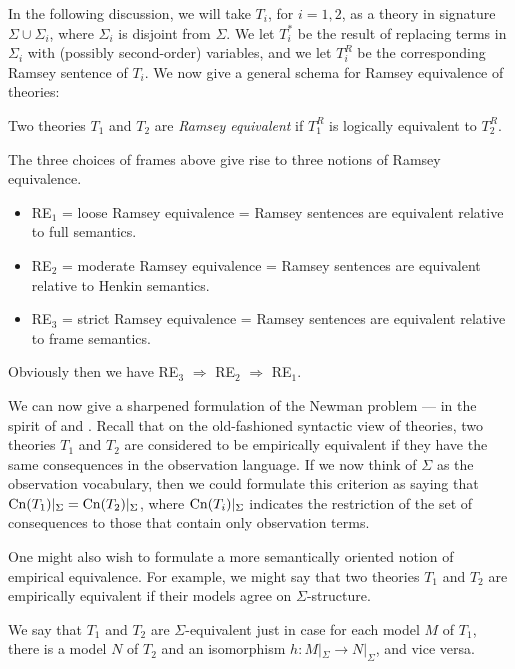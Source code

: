   In the following discussion, we will take $T_i$, for $i=1,2$, as a
  theory in signature $\Sigma\cup \Sigma _i$, where $\Sigma _i$ is
  disjoint from $\Sigma$.  We let $T_i^*$ be the result of replacing
  terms in $\Sigma _i$ with (possibly second-order) variables, and we
  let $T_i^R$ be the corresponding Ramsey sentence of $T_i$.  We now
  give a general schema for Ramsey equivalence of theories:
  \begin{defn} Two theories $T_1$ and $T_2$ are \emph{Ramsey
      equivalent} if $T_1^R$ is logically equivalent to
    $T_2^R$. \end{defn} \noindent The three choices of frames above
  give rise to three notions of Ramsey equivalence.
\begin{itemize}
\item RE$_1$ = loose Ramsey equivalence = Ramsey sentences are
  equivalent relative to full semantics.
\item RE$_2$ = moderate Ramsey equivalence = Ramsey sentences are
equivalent relative to Henkin semantics.
\item RE$_3$ = strict Ramsey equivalence = Ramsey sentences are
  equivalent relative to frame semantics.
\end{itemize}
Obviously then we have RE$_3$ $\Rightarrow$ RE$_2$ $\Rightarrow$
RE$_1$.

We can now give a sharpened formulation of the Newman problem --- in
the spirit of \cite{ketland} and \cite{dew-ram}.  Recall that on the
old-fashioned syntactic view of theories, two theories $T_1$ and $T_2$
are considered to be empirically equivalent if they have the same
consequences in the observation language.  If we now think of $\Sigma$
as the observation vocabulary, then we could formulate this criterion
as saying that $\mathrm{Cn}(T_1)|_\Sigma=\mathrm{Cn}(T_2)|_\Sigma$, where
$\mathrm{Cn}(T_i)|_\Sigma$ indicates the restriction of the set of
consequences to those that contain only observation terms.

One might also wish to formulate a more semantically oriented notion
of empirical equivalence.  For example, we might say that two theories
$T_1$ and $T_2$ are empirically equivalent if their models agree on
$\Sigma$-structure.

\begin{defn} We say that $T_1$ and $T_2$ are $\Sigma$-equivalent just
  in case for each model $M$ of $T_1$, there is a model $N$ of $T_2$
  and an isomorphism $h:M|_\Sigma\to N|_\Sigma$, and vice
  versa. \end{defn}

